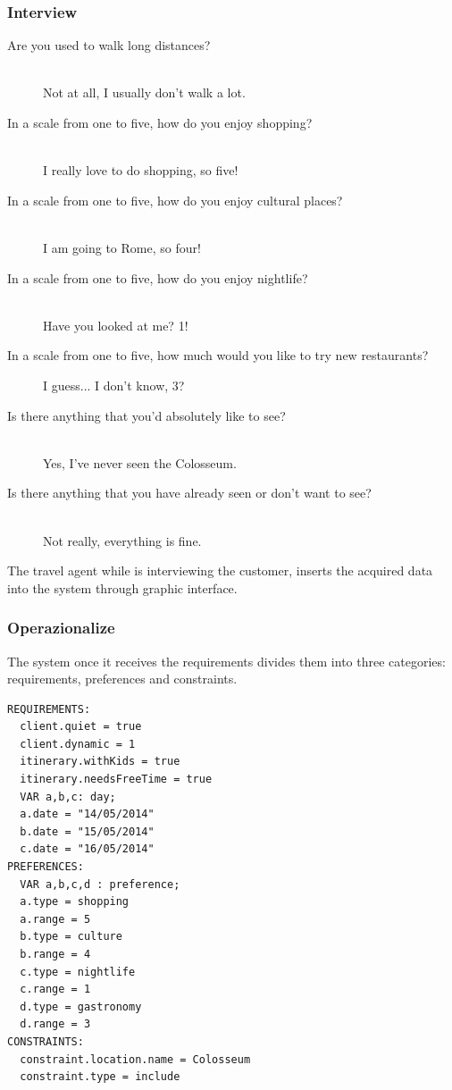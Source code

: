 \documentclass[11pt]{article} %
\begin{document}
\subsubsection{Interview}

\begin{description}
  \item[Are you used to walk long distances?] \hfill \\
  Not at all, I usually don't walk a lot.
  \item[In a scale from one to five, how do you enjoy shopping?] \hfill \\
  I really love to do shopping, so five!
  \item[In a scale from one to five, how do you enjoy cultural places?] \hfill \\
  I am going to Rome, so four!
  \item[In a scale from one to five, how do you enjoy nightlife?] \hfill \\
  Have you looked at me? 1!
  \item[In a scale from one to five, how much would you like to try new restaurants?] \hfill 
  I guess... I don't know, 3?
  \item[Is there anything that you'd absolutely like to see?] \hfill \\
  Yes, I've never seen the Colosseum.
  \item[Is there anything that you have already seen or don't want to see?] \hfill \\
  Not really, everything is fine.
\end{description}

The travel agent while is interviewing the customer, inserts the acquired data into the system through graphic interface.

\subsubsection{Operazionalize}
The system once it receives the requirements divides them into three categories: requirements, preferences and constraints.

\begin{lstlisting}[breaklines=true,mathescape=true]
REQUIREMENTS:
  client.quiet = true
  client.dynamic = 1
  itinerary.withKids = true
  itinerary.needsFreeTime = true
  VAR a,b,c: day;
  a.date = "14/05/2014"
  b.date = "15/05/2014"
  c.date = "16/05/2014"
PREFERENCES:
  VAR a,b,c,d : preference;
  a.type = shopping
  a.range = 5
  b.type = culture
  b.range = 4
  c.type = nightlife
  c.range = 1
  d.type = gastronomy
  d.range = 3
CONSTRAINTS:
  constraint.location.name = Colosseum
  constraint.type = include
\end{lstlisting}
\end{document}
